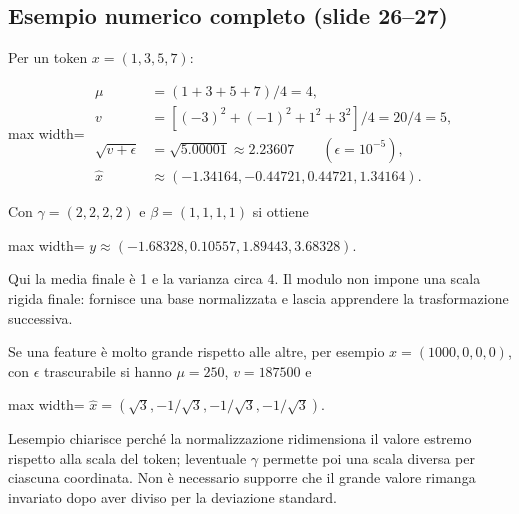 \documentclass[11pt,a4paper,oneside,openany]{book}
\begin{document}
\subsection{Esempio numerico completo (slide 26--27)}\label{f04-r448}

Per un token \(x=(1,3,5,7)\):

\begin{center}
\begin{adjustbox}{max width=\linewidth}
$\displaystyle 
\begin{aligned}
\mu&=(1+3+5+7)/4=4,\\
v&=[(-3)^2+(-1)^2+1^2+3^2]/4=20/4=5,\\
\sqrt{v+\epsilon}&=\sqrt{5.00001}\approx2.23607
\qquad(\epsilon=10^{-5}),\\
\widehat x&\approx(-1.34164,-0.44721,0.44721,1.34164).
\end{aligned}
$
\end{adjustbox}
\end{center}

Con \(\gamma=(2,2,2,2)\) e \(\beta=(1,1,1,1)\) si ottiene

\begin{center}
\begin{adjustbox}{max width=\linewidth}
$\displaystyle \boxed{y\approx(-1.68328,0.10557,1.89443,3.68328).}$
\end{adjustbox}
\end{center}

Qui la media finale è 1 e la varianza circa 4. Il modulo non impone una scala rigida finale: fornisce una base normalizzata e lascia apprendere la trasformazione successiva.

Se una feature è molto grande rispetto alle altre, per esempio \(x=(1000,0,0,0)\), con \(\epsilon\) trascurabile si hanno \(\mu=250\), \(v=187500\) e

\begin{center}
\begin{adjustbox}{max width=\linewidth}
$\displaystyle \widehat x=(\sqrt3,-1/\sqrt3,-1/\sqrt3,-1/\sqrt3).$
\end{adjustbox}
\end{center}

L\textquotesingle esempio chiarisce perché la normalizzazione ridimensiona il valore estremo rispetto alla scala del token; l\textquotesingle eventuale \(\gamma\) permette poi una scala diversa per ciascuna coordinata. Non è necessario supporre che il grande valore rimanga invariato dopo aver diviso per la deviazione standard.
\end{document}
